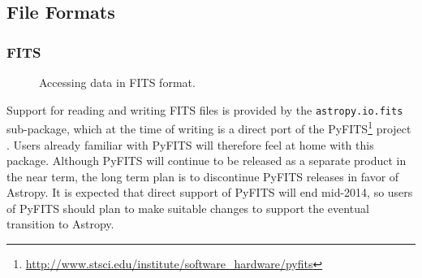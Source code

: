 \documentclass[traditabstract]{aa}
\begin{document}
\subsection{File Formats}

\label{sec:io}

\subsubsection{FITS}


\label{sec:fits}

\begin{figure}
\center
\caption{Accessing data in FITS format.\label{code:fits}}
\vspace{0.1in}
\end{figure}

Support for reading and writing FITS files is provided by the
\texttt{astropy.io.fits} sub-package, which at the time of writing is a
direct port of the
PyFITS\footnote{\url{http://www.stsci.edu/institute/software_hardware/pyfits}}
project \citep{barrett1999pyfits}. Users already familiar with PyFITS will
therefore feel at home with this package. Although PyFITS will continue to be released as a separate product in the near
term, the long term plan is to discontinue PyFITS releases in favor of
Astropy. It is expected that direct support of PyFITS will end mid-2014, so users of PyFITS should plan to make suitable changes to support
the eventual transition to Astropy.
\end{document}
